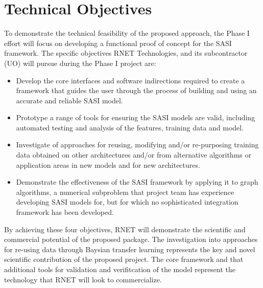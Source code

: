 \section{Technical Objectives}
 
To demonstrate the technical feasibility of the proposed approach, the Phase I effort will focus on developing a functional proof of concept for the SASI framework. The specific objectives RNET Technologies, and its subcontractor (UO) will pursue during the Phase I project are:

\begin{itemize}
  \item Develop the core interfaces and software indirections required to create a framework that 
  guides the user through the process of building and using an accurate and reliable SASI model.
  \item Prototype a range of tools for ensuring the SASI models are valid, including automated testing and analysis of the features, training data and model. 
  \item Investigate of approaches for reusing, modifying and/or re-purposing training data obtained on other architectures and/or from alternative algorithms or application areas in new models and for new architectures. 
  \item Demonstrate the effectiveness of the SASI framework by applying it to graph algorithms, a numerical subproblem that
  project team has experience developing SASI models for, but for which no sophisticated integration framework has been developed. 
\end{itemize}

By achieving these four objectives, RNET will demonstrate the scientific and commercial potential of the proposed package. The investigation into approaches for re-using data through Baysian transfer learning represents the key and novel scientific contribution of the proposed project. The core framework and that additional tools for validation and verifitcation of the model represent the technology that RNET will look to commercialize. 
